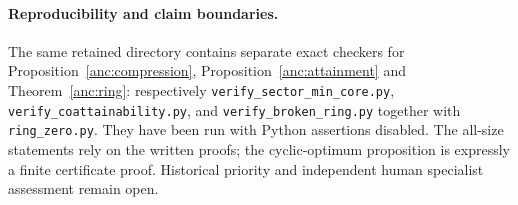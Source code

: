 \paragraph{Reproducibility and claim boundaries.}
The same retained directory contains separate exact checkers for
Proposition~\ref{anc:compression}, Proposition~\ref{anc:attainment}
and Theorem~\ref{anc:ring}: respectively
\texttt{verify\_sector\_min\_core.py},
\texttt{verify\_coattainability.py}, and
\texttt{verify\_broken\_ring.py} together with \texttt{ring\_zero.py}.
They have been run with Python assertions disabled. The all-size
statements rely on the written proofs; the cyclic-optimum proposition
is expressly a finite certificate proof. Historical priority and
independent human specialist assessment remain open.
